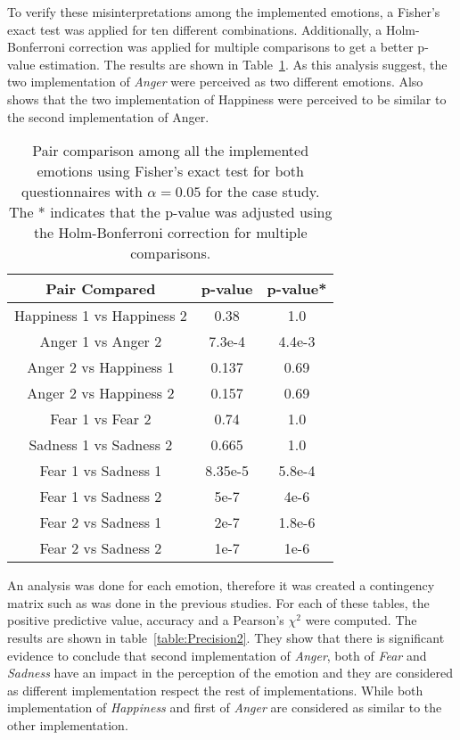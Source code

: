 To verify these misinterpretations among the implemented emotions, a Fisher's exact test was applied for ten different combinations. Additionally, a Holm-Bonferroni correction was applied for multiple comparisons to get a better p-value estimation. The results are shown in Table~\ref{table:result_compare_fourth}. As this analysis suggest, the two implementation of \textit{Anger} were perceived as two different emotions. Also shows that the two implementation of Happiness were perceived to be similar to the second implementation of Anger.

\begin{table}
\centering
\small
\caption{Pair comparison among all the implemented emotions using Fisher's exact test for both questionnaires with $\alpha = 0.05$ for the  case study. The * indicates that the p-value was adjusted using the Holm-Bonferroni correction for multiple comparisons.}
		\label{table:result_compare_fourth}
		\begin{tabular}{|c|c|c|}
			\hline	
\textbf{Pair Compared} & \textbf{p-value} & \textbf{p-value*}\\	
			\hline
			Happiness 1 vs Happiness 2 &0.38&1.0\\
			\hline
			Anger 1 vs Anger 2 & 7.3e-4&4.4e-3\\
			\hline
			Anger 2 vs Happiness 1 & 0.137&0.69\\
			\hline
			Anger 2 vs Happiness 2 & 0.157&0.69\\
			\hline
			Fear 1 vs Fear 2 & 0.74&1.0\\
			\hline
			Sadness 1 vs Sadness 2 & 0.665&1.0\\
			\hline
			Fear 1 vs Sadness 1& 8.35e-5&5.8e-4\\
			\hline
			Fear 1 vs Sadness 2 & 5e-7&4e-6\\
			\hline
			Fear 2 vs Sadness 1 & 2e-7&1.8e-6\\
			\hline
			Fear 2 vs Sadness 2 & 1e-7&1e-6\\
			\hline
			\end{tabular}
\end{table} 

An analysis was done for each emotion, therefore it was created a contingency matrix such as was done in the previous studies. For each of these tables, the positive predictive value, accuracy and a Pearson's $\chi^2$ were computed. The results are shown in table~\ref{table:Precision2}. They show that there is significant evidence to conclude that second implementation of \textit{Anger}, both of \textit{Fear} and \textit{Sadness} have an impact in the perception of the emotion and they are considered as different implementation respect the rest of implementations. While both implementation of \textit{Happiness} and first of \textit{Anger} are considered as similar to the other implementation.

